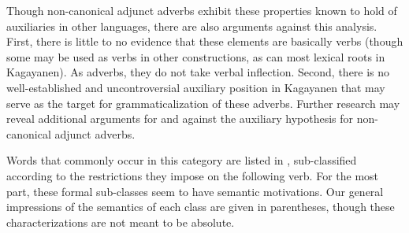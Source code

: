 Though non-canonical adjunct adverbs exhibit these properties known to hold of auxiliaries in other languages, there are also arguments against this analysis. First, there is little to no evidence that these elements are basically verbs (though some may be used as verbs in other constructions, as can most lexical roots in Kagayanen). As adverbs, they do not take verbal inflection. Second, there is no well-established and uncontroversial auxiliary position in Kagayanen that may serve as the target for grammaticalization of these adverbs. Further research may reveal additional arguments for and against the auxiliary hypothesis for non-canonical adjunct adverbs.

Words that commonly occur in this category are listed in , sub-classified according to the restrictions they impose on the following verb. For the most part, these formal sub-classes seem to have semantic motivations. Our general impressions of the semantics of each class are given in parentheses, though these characterizations are not meant to be absolute.

